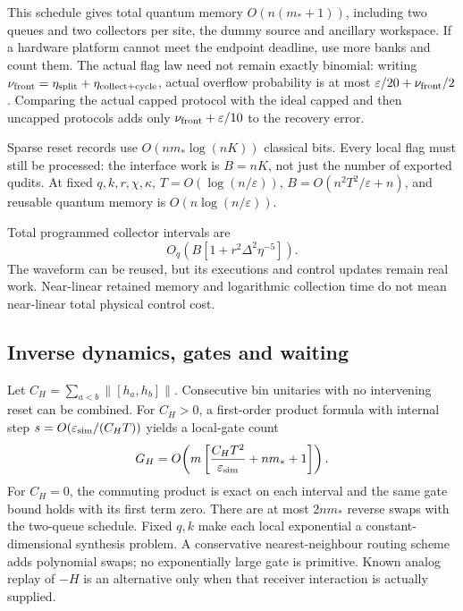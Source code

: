 \documentclass[11pt,a4paper]{article}
\newcommand{\norm}[1]{\left\lVert #1\right\rVert}\newcommand{\ket}[1]{\lvert #1\rangle}\newcommand{\bra}[1]{\langle #1\rvert}
\begin{document}
This schedule gives total quantum memory $O(n(m_*+1))$, including two queues and two collectors per site, the dummy source and ancillary workspace. If a hardware platform cannot meet the endpoint deadline, use more banks and count them. The actual flag law need not remain exactly binomial: writing $\nu_{\rm front}=\eta_{\rm split}+\eta_{\rm collect+cycle}$, actual overflow probability is at most $\varepsilon/20+\nu_{\rm front}/2$. Comparing the actual capped protocol with the ideal capped and then uncapped protocols adds only $\nu_{\rm front}+\varepsilon/10$ to the recovery error.

Sparse reset records use $O(nm_*\log(nK))$ classical bits. Every local flag must still be processed: the interface work is $B=nK$, not just the number of exported qudits. At fixed $q,k,r,\chi,\kappa$, $T=O(\log(n/\varepsilon))$, $B=O(n^2T^2/\varepsilon+n)$, and reusable quantum memory is $O(n\log(n/\varepsilon))$.

Total programmed collector intervals are
\begin{equation}
O_q\!\left(B[1+r^2\Delta^2\eta^{-5}]\right).
\end{equation}
The waveform can be reused, but its executions and control updates remain real work. Near-linear retained memory and logarithmic collection time do not mean near-linear total physical control cost.

\subsection{Inverse dynamics, gates and waiting}

Let $C_H=\sum_{a<b}\norm{[h_a,h_b]}$. Consecutive bin unitaries with no intervening reset can be combined. For $C_H>0$, a first-order product formula with internal step $s=O(\varepsilon_{\rm sim}/(C_HT))$ yields a local-gate count
\begin{equation}
G_H=O\!\left(m\left[\frac{C_HT^2}{\varepsilon_{\rm sim}}+nm_*+1\right]\right).
\end{equation}
For $C_H=0$, the commuting product is exact on each interval and the same gate bound holds with its first term zero. There are at most $2nm_*$ reverse swaps with the two-queue schedule. Fixed $q,k$ make each local exponential a constant-dimensional synthesis problem. A conservative nearest-neighbour routing scheme adds polynomial swaps; no exponentially large gate is primitive. Known analog replay of $-H$ is an alternative only when that receiver interaction is actually supplied.
\end{document}
